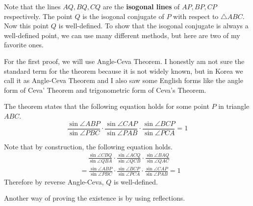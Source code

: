 \documentclass[../../../main.tex]{subfiles}
\begin{document}
Note that the lines $AQ, BQ, CQ$ are the \textbf{isogonal lines} of
$AP, BP, CP$ respectively. The point $Q$ is the isogonal conjugate
of $P$ with respect to $\triangle{ABC}$. Now this point $Q$ is
well-defined. To show that the isogonal conjugate is always a
well-defined point, we can use many different methods, but here
are two of my favorite ones.

For the first proof, we will use Angle-Ceva Theorem. I honestly am
not sure the standard term for the theorem because it is not
widely known, but in Korea we call it as Angle-Ceva Theorem and
I also saw some English forms like the angle form of Ceva' Theorem
and trigonometric form of Ceva's Theorem.

\begin{important}
The theorem states that
the following equation holds for some point $P$ in triangle $ABC$.
\[
\frac{\sin\angle{ABP}}{\sin\angle{PBC}} \cdot
    \frac{\sin\angle{CAP}}{\sin\angle{PAB}} \cdot
    \frac{\sin\angle{BCP}}{\sin\angle{PCA}}
= 1
\]
\end{important}

Note that by construction, the following equation holds.
\begin{align*}
    &\quad\ \frac{\sin\angle{CBQ}}{\sin\angle{QBA}} \cdot
        \frac{\sin\angle{ACQ}}{\sin\angle{QCB}} \cdot
        \frac{\sin\angle{BAQ}}{\sin\angle{QAC}} \\
    &= \frac{\sin\angle{ABP}}{\sin\angle{PBC}} \cdot
        \frac{\sin\angle{BCP}}{\sin\angle{PCA}} \cdot
        \frac{\sin\angle{CAP}}{\sin\angle{PAB}}
    = 1
\end{align*}
Therefore by reverse Angle-Ceva, $Q$ is well-defined.

Another way of proving the existence is by using reflections.
\end{document}
